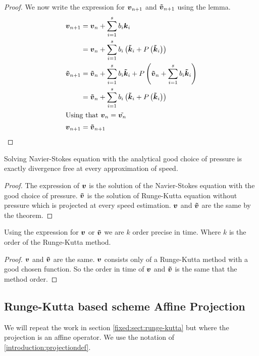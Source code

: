 \begin{proof}
We now write the expression for ${\boldsymbol {v}}_{n+1}$ and ${\boldsymbol {\tilde{v}}}_{n+1}$ using the lemma.
\begin{align*}
{\boldsymbol {v}}_{n+1}&={\boldsymbol {v}}_{n}+\sum_{i=1}^{s}b_{i}{\boldsymbol {k}}_{i}\\
&={\boldsymbol {v}}_{n}+\sum_{i=1}^{s}b_{i}\left({\boldsymbol {\tilde{k}}}_{i}+P\left({\boldsymbol {\tilde{k}}}_{i}\right)\right)\\
{\boldsymbol {\tilde{v}}}_{n+1}&={\boldsymbol {\tilde{v}}}_{n}+\sum_{i=1}^{s}b_{i}{\boldsymbol {\tilde{k}}}_{i}+P\left({\boldsymbol {\tilde{v}}}_{n}+\sum_{i=1}^{s}b_{i}{\boldsymbol {\tilde{k}}}_{i}\right)\\
&={\boldsymbol {\tilde{v}}}_{n}+\sum_{i=1}^{s}b_{i}\left({\boldsymbol {\tilde{k}}}_{i}+P\left({\boldsymbol {\tilde{k}}}_{i}\right)\right)\\
\intertext{Using that ${\boldsymbol {v}}_{n}=\tilde{{\boldsymbol {v}}_{n}}$}
{\boldsymbol {v}}_{n+1}&={\boldsymbol {\tilde{v}}}_{n+1}
\end{align*}

\end{proof}

\begin{corollary}
Solving Navier-Stokes equation with the analytical good choice of pressure is exactly divergence free at every approximation of speed.
\end{corollary}
\begin{proof}
  The expression of ${\boldsymbol {v}}$ is the solution of the Navier-Stokes equation with the good choice of pressure.
  ${\boldsymbol {\tilde{v}}}$ is the solution of Runge-Kutta equation without pressure which is projected at every speed estimation.
  ${\boldsymbol {v}}$ and ${\boldsymbol {\tilde{v}}}$ are the same by the theorem.
\end{proof}

\begin{corollary}
  Using the expression for ${\boldsymbol {v}}$ or ${\boldsymbol {\tilde{v}}}$ we are $k$ order precise in time. Where $k$ is the order of the Runge-Kutta method.
\end{corollary}
\begin{proof}
  ${\boldsymbol {v}}$ and ${\boldsymbol {\tilde{v}}}$ are the same.
  ${\boldsymbol {v}}$ consists only of a Runge-Kutta method with a good chosen function.
  So the order in time of ${\boldsymbol {v}}$ and ${\boldsymbol {\tilde{v}}}$ is the same that the method order.
\end{proof}


\subsection{Runge-Kutta based scheme Affine Projection}
\label{fixed:sect:runge-kutta:affine}
We will repeat the work in section \ref{fixed:sect:runge-kutta} but where the projection is an affine operator.
We use the notation of \ref{introduction:projectiondef}.

